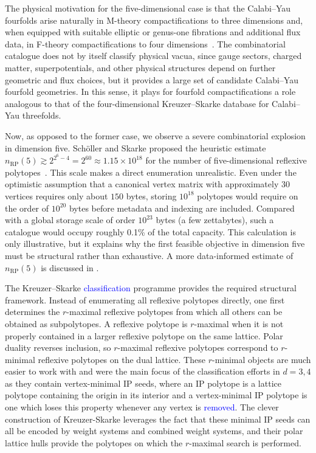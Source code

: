 \documentclass[appliedmath,article,submit,moreauthors]{Definitions/mdpi}
\begin{document}
The physical motivation for the five-dimensional case is that the Calabi--Yau
fourfolds arise naturally in M-theory compactifications to three dimensions and,
when equipped with suitable elliptic or genus-one fibrations and additional flux
data, in F-theory compactifications to four
dimensions~\cite{Vafa1996,MorrisonVafa1996I,MorrisonVafa1996II,BeckerBecker1996,BrunnerSchimmrigk1996,Weigand2018}.
The combinatorial catalogue does not by itself classify physical vacua, since
gauge sectors, charged matter, superpotentials, and other physical structures
depend on further geometric and flux choices, but it provides a large set of
candidate Calabi--Yau fourfold geometries. In this sense, it plays for fourfold
compactifications a role analogous to that of the four-dimensional
Kreuzer--Skarke database for Calabi--Yau threefolds.

Now, as opposed to the former case, we observe a severe combinatorial explosion
in dimension five. Sch\"oller and Skarke proposed the heuristic estimate
\(n_{\mathrm{RP}}(5)\gtrsim2^{2^6-4}=2^{60}\approx1.15\times10^{18}\) for the
number of five-dimensional reflexive polytopes~\cite{Scholler2019}. This scale
makes a direct enumeration unrealistic. Even under the optimistic assumption
that a canonical vertex matrix with approximately \(30\) vertices requires only
about \(150\) bytes, storing \(10^{18}\) polytopes would require on the order of
\(10^{20}\) bytes before metadata and indexing are included. Compared with a
global storage scale of order \(10^{23}\) bytes (a few zettabytes), such a
catalogue would occupy roughly 0.1\% of the total capacity. This calculation is
only illustrative, but it explains why the first feasible objective in dimension
five must be structural rather than exhaustive. A more data-informed estimate of
\(n_{\mathrm{RP}}(5)\) is discussed in .

The Kreuzer--Skarke \textcolor{blue}{classification} programme provides the required structural
framework. Instead of enumerating all reflexive polytopes directly, one first
determines the \(r\)-maximal reflexive polytopes from which all others can be
obtained as subpolytopes. A reflexive polytope is \(r\)-maximal when it is not
properly contained in a larger reflexive polytope on the same lattice. Polar
duality reverses inclusion, so \(r\)-maximal reflexive polytopes correspond to
\(r\)-minimal reflexive polytopes on the dual lattice. These \(r\)-minimal
objects are much easier to work with and were the main focus of the
classification efforts in $d=3,4$ as they contain vertex-minimal IP seeds, where
an IP polytope is a lattice polytope containing the origin in its interior and a
vertex-minimal IP polytope is one which loses this property whenever any vertex
is \textcolor{blue}{removed}. The clever construction of Kreuzer-Skarke leverages the fact that
these minimal IP seeds can all be encoded by weight systems and combined weight
systems, and their polar lattice hulls provide the polytopes on which the
\(r\)-maximal search is performed.
\end{document}

